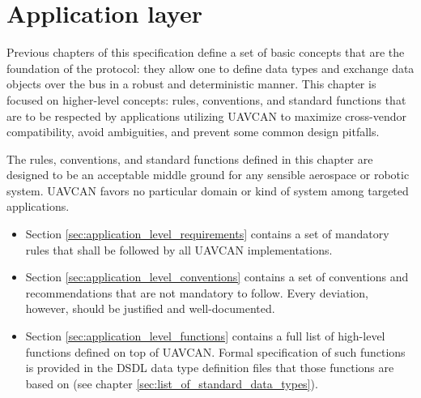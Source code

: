 \chapter{Application layer}\label{sec:application_layer}

Previous chapters of this specification define a set of basic concepts that are the foundation of the protocol:
they allow one to define data types and exchange data objects over the bus in a robust and deterministic manner.
This chapter is focused on higher-level concepts: rules, conventions, and standard functions that are to be
respected by applications utilizing UAVCAN to maximize cross-vendor compatibility, avoid ambiguities, and
prevent some common design pitfalls.

The rules, conventions, and standard functions defined in this chapter are designed to be an acceptable middle
ground for any sensible aerospace or robotic system.
UAVCAN favors no particular domain or kind of system among targeted applications.

\begin{itemize}
    \item Section \ref{sec:application_level_requirements} contains a set of mandatory rules that shall be
    followed by all UAVCAN implementations.

    \item Section \ref{sec:application_level_conventions} contains a set of conventions and recommendations that
    are not mandatory to follow. Every deviation, however, should be justified and well-documented.

    \item Section \ref{sec:application_level_functions} contains a full list of high-level functions defined on
    top of UAVCAN. Formal specification of such functions is provided in the DSDL data type definition files that
    those functions are based on (see chapter \ref{sec:list_of_standard_data_types}).
\end{itemize}

\clearpage
\clearpage
\clearpage
